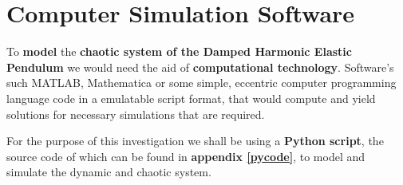 \section{{Computer Simulation Software}}
        
    {To \textbf{model} the \textbf{chaotic system of the Damped Harmonic Elastic Pendulum} we would need the aid of \textbf{computational technology}. Software's such MATLAB, Mathematica or some simple, eccentric computer programming language code in a emulatable script format, that would compute and yield solutions for necessary simulations that are required.}
    
    {For the purpose of this investigation we shall be using a \textbf{Python script}, the source code of which can be found in \textbf{appendix \ref{pycode}}, to model and simulate the dynamic and chaotic system.}
        
        



